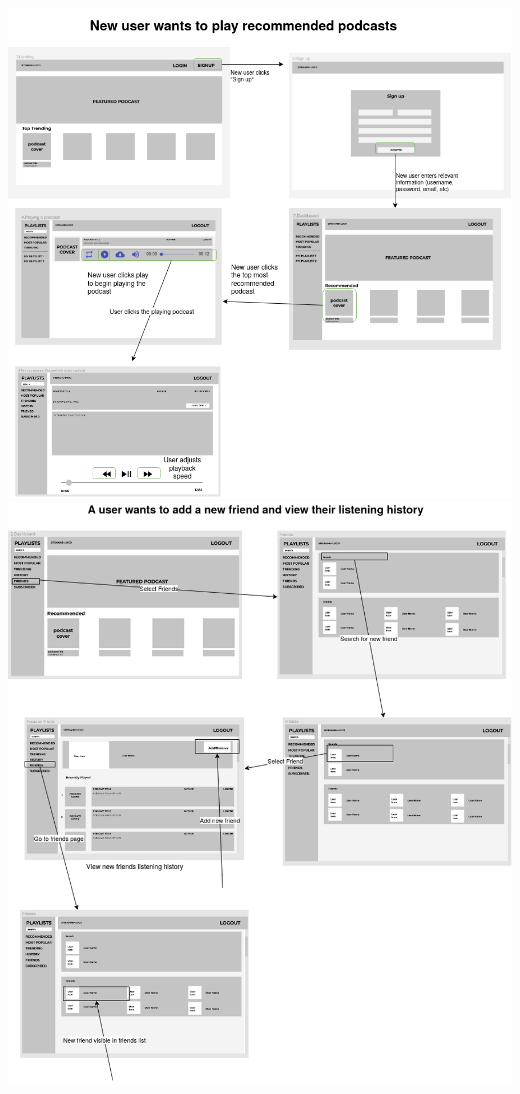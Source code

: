 \documentclass[12pt]{article}
\begin{document}
\begin{appendices}
\begin{center}
        \newpage
        \includegraphics[width=\textwidth]{resources/playing_recommended_podcast_with_cc}
        \includegraphics[width=\textwidth]{resources/friends}

\end{center}
\end{appendices}
\end{document}
